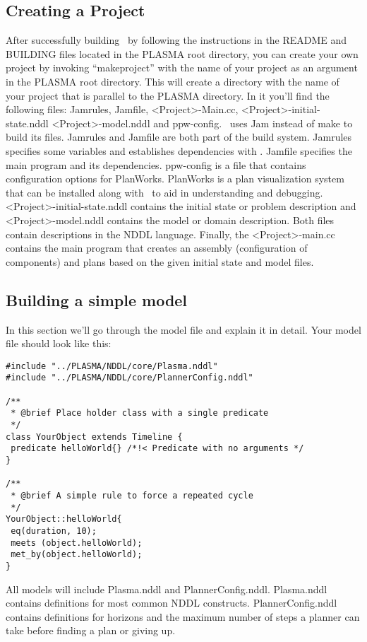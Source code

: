 \documentclass[10pt, letterpaper, twoside]{article}
\begin{document}
{\subsection{Creating a Project}
After successfully building \ET\, by following the instructions in the
README and BUILDING files located in the PLASMA root directory, you can
create your own project by invoking ``makeproject'' with the name of your
project as an argument in the PLASMA root directory.  This will create a
directory with the name of your project that is parallel to the PLASMA
directory.  In it you'll find the following files: Jamrules, Jamfile,
<Project>-Main.cc, <Project>-initial-state.nddl <Project>-model.nddl and
ppw-config.  \ET\, uses Jam instead of make to build its files.  Jamrules
and Jamfile are both part of the build system.  Jamrules specifies some
variables and establishes dependencies with \ET.  Jamfile specifies the
main program and its dependencies.  ppw-config is a file that contains
configuration options for PlanWorks.  PlanWorks is a plan visualization
system that can be installed along with \ET\, to aid in understanding and
debugging.  <Project>-initial-state.nddl contains the initial state or
problem description and <Project>-model.nddl contains the model or domain
description. Both files contain descriptions in the NDDL language.
Finally, the <Project>-main.cc contains the main program that creates an
assembly (configuration of \ET\, components) and plans based on the given
initial state and model files.

\subsection{Building a simple model}
In this section we'll go through the model file and explain it in detail.
Your model file should look like this:

\begin{verbatim}
#include "../PLASMA/NDDL/core/Plasma.nddl"
#include "../PLASMA/NDDL/core/PlannerConfig.nddl"

/**
 * @brief Place holder class with a single predicate
 */
class YourObject extends Timeline {
 predicate helloWorld{} /*!< Predicate with no arguments */
}

/**
 * @brief A simple rule to force a repeated cycle
 */
YourObject::helloWorld{
 eq(duration, 10);
 meets (object.helloWorld);
 met_by(object.helloWorld);
}
\end{verbatim}

All models will include Plasma.nddl and PlannerConfig.nddl.  Plasma.nddl
contains definitions for most common NDDL constructs.  PlannerConfig.nddl
contains definitions for horizons and the maximum number of steps a planner
can take before finding a plan or giving up.

}
\end{document}
